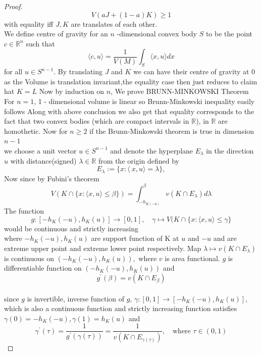\documentclass[oneside]{book}
\begin{document}
\begin{proof}
		\[
		V(a J+(1-a) K) \geq 1
		\]
		with equality iff $J, K$ are translates of each other.
		\\
		We define centre of gravity for an $n$ -dimensional convex body $S$ to be the point $c \in \mathbb{R}^{n}$ such that
		\[
		\langle c, u\rangle=\frac{1}{V(M)} \int_{S}\langle x, u\rangle d x
		\]
		for all $u \in S^{n-1} .$ 
		By translating  $J$ and $K$ we can have their centre of gravity at 0 as the Volume is translation invariant,the equality case then just reduces to claim hat $K=L$
		\hfill \break
		Now by induction on $n$, We prove  BRUNN-MINKOWSKI Theorem 
		\hfill \break
		For $n=1$, 1 - dimensional volume is linear so Brunn-Minkowski inequality easily follows   
		\hfill \break 
		Along with above conclusion we also get that equality corresponds to the fact that two convex bodies (which are compact intervals in $\mathbb{R}$), in $\mathbb{R}$  are homothetic.
		\hfill \break 
		Now for $n \geq 2$ if the Brunn-Minkowski theorem is true in dimension $n-1 $
		\\
		we choose a unit vector $u \in S^{n-1}$ and denote 
		the hyperplane $E_{\lambda}$ in the direction $u$ with  distance(signed) $\lambda \in \mathbb{R} $ from the origin defined by 
		\[
		E_{\lambda}:=\{x:\langle\ x, u\rangle=\lambda\}, 
		\]
		Now since by Fubini's theorem  
		\[
		V(K \cap\{x: \langle x, u\rangle \leq \beta\}) = \int_{-h_{ K(-u)}}^{\beta} v\left(K \cap E_{\lambda}\right) d \lambda
		\] 
		The function
		\[
		g:\left[-h_{K}(-u), h_{K}(u)\right] \rightarrow[0,1], \quad \gamma \mapsto V(K \cap\{x:\langle x, u\rangle \leq  \gamma \}
		\]
		would be  continuous and strictly increasing\\
		where $-h_{K}(-u), h_{K}(u)$ are support function of K at $u$ and $-u$ and are extreme upper point and extreme lower point respectively.
		\hfill \break
		Map $\lambda \mapsto v\left(K \cap E_{\lambda}\right)$ is continuous on $\left(-h_{K}(-u), h_{K}(u)\right),$ where $v$ is area functional.
		$g$ is differentiable function on $\left(-h_{K}(-u), h_{K}(u)\right)$ and $$g^{\prime}(\beta)=v\left(K \cap E_{\beta}\right)$$
		\\
		since $g$ is invertible, inverse function of $g$, $ \gamma:[0,1] \rightarrow\left[-h_{K}(-u), h_{K}(u)\right],$ which is also a continuous function and strictly increasing  function satisfies $ \gamma(0)=-h_{K}(-u),  \gamma(1)=h_{K}(u)$ and
		\[
		\gamma^{\prime}(\tau)=\frac{1}{g^{\prime}( \gamma(\tau))}=\frac{1}{v\left(K \cap E_{ \gamma(\tau)}\right)}, \quad  \text{where } \tau \in(0,1)
\]
\end{proof}
\end{document}
